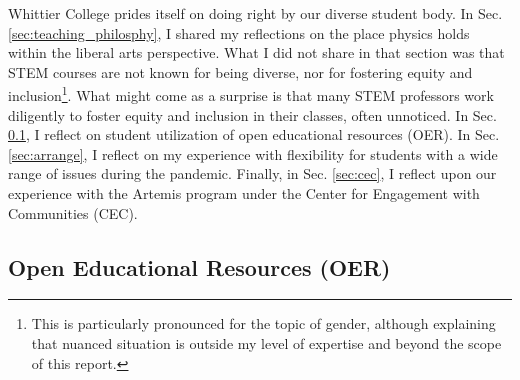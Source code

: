 \documentclass[../../../main.tex]{subfiles}
\begin{document}
Whittier College prides itself on doing right by our diverse student body.  In Sec. \ref{sec:teaching_philosphy}, I shared my reflections on the place physics holds within the liberal arts perspective.  What I did not share in that section was that STEM courses are not known for being diverse, nor for fostering equity and inclusion\footnote{This is particularly pronounced for the topic of gender, although explaining that nuanced situation is outside my level of expertise and beyond the scope of this report.}.  What might come as a surprise is that many STEM professors work diligently to foster equity and inclusion in their classes, often unnoticed.  In Sec. \ref{sec:oer}, I reflect on student utilization of open educational resources (OER).  In Sec. \ref{sec:arrange}, I reflect on my experience with flexibility for students with a wide range of issues during the pandemic.  Finally, in Sec. \ref{sec:cec}, I reflect upon our experience with the Artemis program under the Center for Engagement with Communities (CEC).

\subsection{Open Educational Resources (OER)}
\label{sec:oer}
\end{document}
